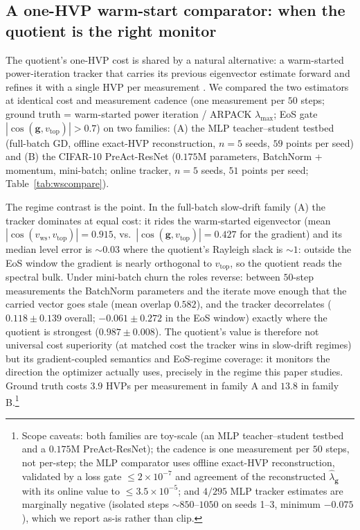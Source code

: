 \documentclass{article}
\theoremstyle{plain}
\theoremstyle{definition}
\theoremstyle{remark}
\newcommand{\lmax}{\lambda_{\max}}
\newcommand{\lhatg}{\hat{\lambda}_{\mathbf{g}}}
\begin{document}
\subsection{A one-HVP warm-start comparator: when the quotient is the
right monitor}
\label{sub:wscompare}
The quotient's one-HVP cost is shared by a natural alternative: a
warm-started power-iteration tracker that carries its previous
eigenvector estimate forward and refines it with a single HVP per
measurement \citep{ramasinghe2026taming}. We compared the two estimators
at identical cost and measurement cadence (one measurement per $50$
steps; ground truth = warm-started power iteration / ARPACK $\lmax$; EoS
gate $|\cos(\mathbf{g},v_{\mathrm{top}})|>0.7$) on two families: (A) the
MLP teacher--student testbed (full-batch GD, offline exact-HVP
reconstruction, $n{=}5$ seeds, $59$ points per seed) and (B) the
CIFAR-10 PreAct-ResNet ($0.175$M parameters, BatchNorm + momentum,
mini-batch; online tracker, $n{=}5$ seeds, $51$ points per seed;
Table~\ref{tab:wscompare}).

The regime contrast is the point. In the full-batch slow-drift family
(A) the tracker dominates at equal cost: it rides the warm-started
eigenvector (mean $|\cos(v_{\mathrm{ws}},v_{\mathrm{top}})|=0.915$,
vs.\ $|\cos(\mathbf{g},v_{\mathrm{top}})|=0.427$ for the gradient) and
its median level error is ${\sim}0.03$ where the quotient's Rayleigh
slack is ${\sim}1$: outside the EoS window the gradient is nearly
orthogonal to $v_{\mathrm{top}}$, so the quotient reads the spectral
bulk. Under mini-batch churn the roles reverse: between $50$-step
measurements the BatchNorm parameters and the iterate move enough that
the carried vector goes stale (mean overlap $0.582$), and the tracker
decorrelates ($0.118\!\pm\!0.139$ overall; $-0.061\!\pm\!0.272$ in the
EoS window) exactly where the quotient is strongest
($0.987\!\pm\!0.008$). The quotient's value is therefore not universal
cost superiority (at matched cost the tracker wins in slow-drift
regimes) but its gradient-coupled semantics and EoS-regime coverage: it
monitors the direction the optimizer actually uses, precisely in the
regime this paper studies. Ground truth costs $3.9$ HVPs per measurement
in family A and $13.8$ in family B.\footnote{Scope caveats: both
families are toy-scale (an MLP teacher--student testbed and a $0.175$M
PreAct-ResNet); the cadence is one measurement per $50$ steps, not
per-step; the MLP comparator uses offline exact-HVP reconstruction,
validated by a loss gate $\le 2\times10^{-7}$ and agreement of the
reconstructed $\lhatg$ with its online value to $\le 3.5\times10^{-5}$;
and $4/295$ MLP tracker estimates are marginally negative (isolated
steps ${\sim}850$--$1050$ on seeds 1--3, minimum $-0.075$), which we
report as-is rather than clip.}
\end{document}
